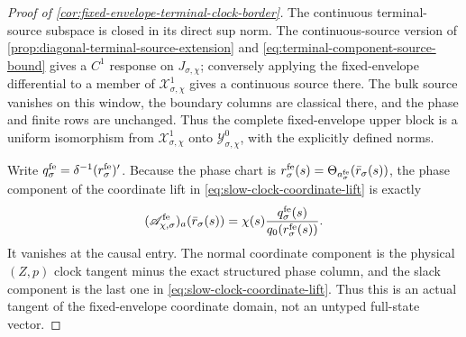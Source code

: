 \begin{proof}[Proof of
\cref{cor:fixed-envelope-terminal-clock-border}]
The continuous terminal-source subspace is closed in its direct sup norm.
The continuous-source version of
\cref{prop:diagonal-terminal-source-extension} and
\cref{eq:terminal-component-source-bound} gives a \(C^1\) response on
\(J_{\sigma,\chi}\); conversely applying the fixed-envelope differential
to a member of \(\mathcal X_{\sigma,\chi}^1\) gives a continuous source
there.  The bulk source vanishes on this window, the boundary columns are
classical there, and the phase and finite rows are unchanged.  Thus the
complete fixed-envelope upper block is a uniform isomorphism from
\(\mathcal X_{\sigma,\chi}^1\) onto
\(\mathcal Y_{\sigma,\chi}^0\), with the explicitly defined norms.

Write
\(q_\sigma^{\rm fe}=\delta^{-1}(r_\sigma^{\rm fe})'\).  Because the
phase chart is \(r_\sigma^{\rm fe}(s)
=\Theta_{a_\sigma^{\rm fe}}(\bar r_\sigma(s))\), the phase component of
the coordinate lift in \cref{eq:slow-clock-coordinate-lift} is exactly
\begin{equation}
 (\mathscr A_{\chi,\sigma}^{\rm fe})_a
       (\bar r_\sigma(s))
 =\chi(s)\frac{q_\sigma^{\rm fe}(s)}
                 {q_0(r_\sigma^{\rm fe}(s))}.             \label{eq:proof-slow-clock-phase-lift}
\end{equation}
It vanishes at the causal entry.  The normal coordinate component is the
physical \((Z,p)\) clock tangent minus the exact structured phase column,
and the slack component is the last one in
\cref{eq:slow-clock-coordinate-lift}.  Thus this is an actual tangent of
the fixed-envelope coordinate domain, not an untyped full-state vector.


\end{proof}
